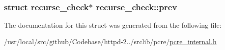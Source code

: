 \subsubsection[{\texorpdfstring{prev}{prev}}]{\setlength{\rightskip}{0pt plus 5cm}struct {\bf recurse\+\_\+check}$\ast$ recurse\+\_\+check\+::prev}\hypertarget{structrecurse__check_a9ab7a062e2fbde353f41aafd66d8486e}{}\label{structrecurse__check_a9ab7a062e2fbde353f41aafd66d8486e}


The documentation for this struct was generated from the following file\+:\begin{DoxyCompactItemize}
\item 
/usr/local/src/github/\+Codebase/httpd-\/2../srclib/pcre/\hyperlink{pcre__internal_8h}{pcre\+\_\+internal.\+h}\end{DoxyCompactItemize}
